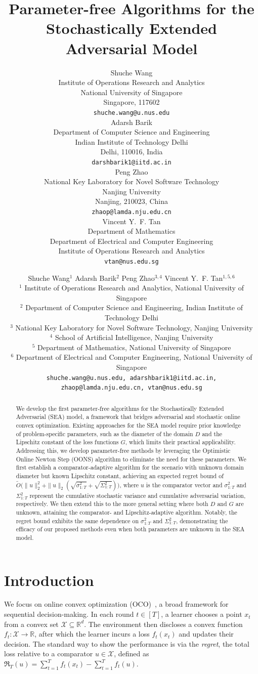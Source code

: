 \documentclass{article}
\title{Parameter-free Algorithms for the Stochastically Extended Adversarial Model}
\author{%
    Shuche Wang \\
    Institute of Operations Research and Analytics\\
    National University of Singapore\\
    Singapore, 117602 \\
    \texttt{shuche.wang@u.nus.edu} \\
    \And
    Adarsh Barik\\
    Department of Computer Science and Engineering\\
    Indian Institute of Technology Delhi\\
    Delhi, 110016, India\\
    \texttt{darshbarik1@iitd.ac.in}\\
    \And
    Peng Zhao\\
    National Key Laboratory for Novel Software Technology\\
    Nanjing University\\
    Nanjing, 210023, China\\
    \texttt{zhaop@lamda.nju.edu.cn}\\
    \And
    Vincent Y.~F. Tan\\
    Department of Mathematics\\
    Department of Electrical and Computer Engineering\\
    Institute of Operations Research and Analytics\\
    \texttt{vtan@nus.edu.sg}
}
\author{
  Shuche Wang$^{1}$ \quad
  Adarsh Barik$^{2}$ \quad
  Peng Zhao$^{3,4}$ \quad
  Vincent Y.~F. Tan$^{1,5,6}$\\[4pt]
  \small $^{1}$ Institute of Operations Research and Analytics, National University of Singapore \\
  \small $^{2}$ Department of Computer Science and Engineering, Indian Institute of Technology Delhi \\
  \small $^{3}$ National Key Laboratory for Novel Software Technology, Nanjing University \\
  \small $^{4}$ School of Artificial Intelligence, Nanjing University \\
  \small $^{5}$ Department of Mathematics, National University of Singapore \\
  \small $^{6}$ Department of Electrical and Computer Engineering, National University of Singapore \\[3pt]
    \small \texttt{shuche.wang@u.nus.edu, adarshbarik1@iitd.ac.in,}\\[-2pt]
    \small \texttt{zhaop@lamda.nju.edu.cn, vtan@nus.edu.sg}
}
\theoremstyle{plain}
\theoremstyle{definition}
\theoremstyle{remark}
\newcommand{\cX}{\mathcal{X}}
\newcommand{\regret}{\mathfrak{R}}
\newcommand{\real}{\mathbb{R}}
\renewcommand{\tilde}{\widetilde}
\begin{document}
\maketitle

\begin{abstract}
We develop the first parameter-free algorithms for the Stochastically Extended Adversarial (SEA) model, a framework that bridges adversarial and stochastic online convex optimization. Existing approaches for the SEA model require prior knowledge of problem-specific parameters, such as the diameter of the domain $D$ and the Lipschitz constant of the loss functions $G$, which limits their practical applicability. Addressing this, we develop parameter-free methods by leveraging the Optimistic Online Newton Step (OONS) algorithm to eliminate the need for these parameters. We first establish a comparator-adaptive algorithm for the scenario with unknown domain diameter but known Lipschitz constant, achieving an expected regret bound of $\tilde{O}\big(\|u\|_2^2 + \|u\|_2(\sqrt{\sigma^2_{1:T}} + \sqrt{\Sigma^2_{1:T}})\big)$, where $u$ is the comparator vector and $\sigma^2_{1:T}$ and $\Sigma^2_{1:T}$ represent the cumulative stochastic variance and cumulative adversarial variation, respectively. We then extend this to the more general setting where both $D$ and $G$ are unknown, attaining the comparator- and Lipschitz-adaptive algorithm. Notably, the regret bound exhibits the same dependence on $\sigma^2_{1:T}$ and $\Sigma^2_{1:T}$, demonstrating the efficacy of our proposed methods even when both parameters are unknown in the SEA model. 
\end{abstract}

\section{Introduction}
We focus on online convex optimization (OCO)~\cite{cesa2006prediction,hazan2016introduction,orabona2019modern}, a broad framework for sequential decision-making. In each round $t \in [T]$, a learner chooses a point $x_t$ from a convex set $\cX \subseteq \real^d$. The environment then discloses a convex function $f_t : \cX \to \real$, after which the learner incurs a loss $f_t(x_t)$ and updates their decision. The standard way to show the performance is via the \emph{regret}, the total loss relative to a comparator $u\in\cX$, defined as $\regret_T(u) = \sum_{t=1}^T f_t(x_t) - \sum_{t=1}^T f_t(u)$.

\end{document}
